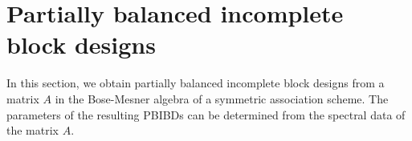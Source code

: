 \documentclass[11pt]{article}
\begin{document}


\section{Partially balanced incomplete block designs%
}\label{sec:pbibd}
In this section, we obtain partially balanced incomplete block designs from a matrix $A$ in the Bose-Mesner algebra of a symmetric association scheme.
The parameters of the resulting PBIBDs can be determined from the spectral data of the matrix $A$. 
\end{document}
